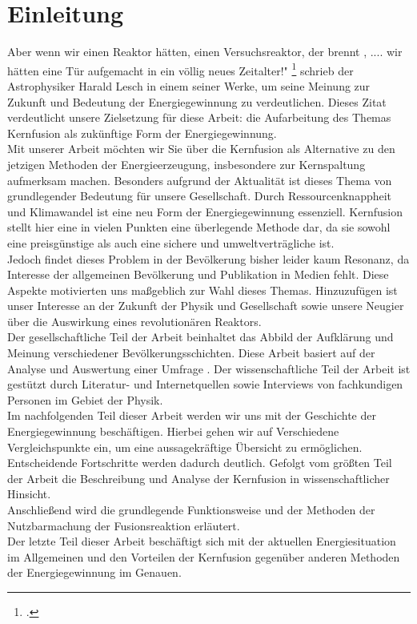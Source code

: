 \section{Einleitung}
Aber wenn wir einen Reaktor hätten, einen Versuchsreaktor, der brennt , .... wir hätten eine Tür aufgemacht in ein völlig neues Zeitalter!" \footcite{LeschH} schrieb der Astrophysiker Harald Lesch in einem seiner Werke, um seine Meinung zur Zukunft und Bedeutung der Energiegewinnung zu verdeutlichen. Dieses Zitat verdeutlicht unsere Zielsetzung für diese Arbeit: die Aufarbeitung des Themas Kernfusion als zukünftige Form der Energiegewinnung.\\
Mit unserer Arbeit möchten wir Sie über die Kernfusion als Alternative zu den jetzigen Methoden der Energieerzeugung, insbesondere zur Kernspaltung aufmerksam machen. Besonders aufgrund der Aktualität ist dieses Thema von grundlegender Bedeutung für unsere Gesellschaft. Durch Ressourcenknappheit und Klimawandel ist eine neu Form der Energiegewinnung essenziell. Kernfusion stellt hier eine in vielen Punkten eine überlegende Methode dar, da sie sowohl eine preisgünstige als auch eine sichere und umweltverträgliche ist. \\
Jedoch findet dieses Problem in der Bevölkerung bisher leider kaum Resonanz, da Interesse der allgemeinen Bevölkerung und Publikation in Medien fehlt. Diese Aspekte motivierten uns maßgeblich zur Wahl dieses Themas. Hinzuzufügen ist unser Interesse an der Zukunft der Physik und Gesellschaft sowie unsere Neugier über die Auswirkung eines revolutionären Reaktors.\\ 
Der gesellschaftliche Teil der Arbeit beinhaltet das Abbild der Aufklärung und Meinung verschiedener Bevölkerungsschichten. Diese Arbeit basiert auf der Analyse und Auswertung einer Umfrage . Der wissenschaftliche Teil der Arbeit ist gestützt durch Literatur- und Internetquellen sowie Interviews von fachkundigen Personen im Gebiet der Physik.\\
Im nachfolgenden Teil dieser Arbeit werden wir uns mit der Geschichte der Energiegewinnung beschäftigen. Hierbei gehen wir auf Verschiedene Vergleichspunkte ein, um eine aussagekräftige Übersicht zu ermöglichen. Entscheidende Fortschritte werden dadurch deutlich. Gefolgt vom größten Teil der Arbeit die Beschreibung und Analyse der Kernfusion in wissenschaftlicher Hinsicht.\\
Anschließend wird die grundlegende Funktionsweise und der Methoden der Nutzbarmachung der Fusionsreaktion erläutert.\\
Der letzte Teil dieser Arbeit beschäftigt sich mit der aktuellen Energiesituation im Allgemeinen und den Vorteilen der Kernfusion gegenüber anderen Methoden der Energiegewinnung im Genauen.\\
